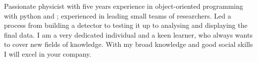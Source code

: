 Passionate physicist with five years experience in object-oriented programming with python and \cpp; experienced in leading small teams of researchers.
Led a process from building a detector to testing it up to analysing and displaying the final data.
I am a very dedicated individual and a keen learner, who always wants to cover new fields of knowledge.
With my broad knowledge and good social skills I will excel in your company.\par


